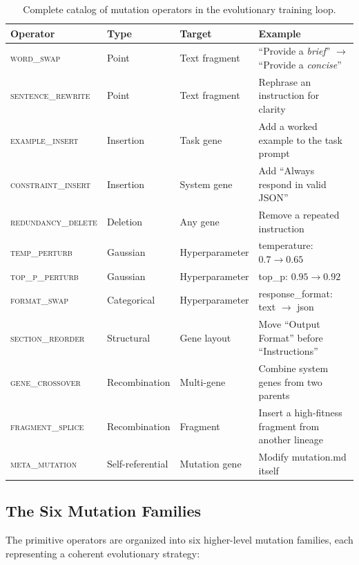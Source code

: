 \begin{table}[H]
\centering
\caption{Complete catalog of mutation operators in the evolutionary training loop.}
\label{tab:mutation-operators}
\renewcommand{\arraystretch}{1.15}
\begin{tabularx}{\textwidth}{l l l Y}
\toprule
\textbf{Operator} & \textbf{Type} & \textbf{Target} & \textbf{Example} \\
\midrule
\textsc{word\_swap} & Point & Text fragment & ``Provide a \emph{brief}'' $\to$ ``Provide a \emph{concise}'' \\
\textsc{sentence\_rewrite} & Point & Text fragment & Rephrase an instruction for clarity \\
\textsc{example\_insert} & Insertion & Task gene & Add a worked example to the task prompt \\
\textsc{constraint\_insert} & Insertion & System gene & Add ``Always respond in valid JSON'' \\
\textsc{redundancy\_delete} & Deletion & Any gene & Remove a repeated instruction \\
\textsc{temp\_perturb} & Gaussian & Hyperparameter & temperature: $0.7 \to 0.65$ \\
\textsc{top\_p\_perturb} & Gaussian & Hyperparameter & top\_p: $0.95 \to 0.92$ \\
\textsc{format\_swap} & Categorical & Hyperparameter & response\_format: text $\to$ json \\
\textsc{section\_reorder} & Structural & Gene layout & Move ``Output Format'' before ``Instructions'' \\
\textsc{gene\_crossover} & Recombination & Multi-gene & Combine system genes from two parents \\
\textsc{fragment\_splice} & Recombination & Fragment & Insert a high-fitness fragment from another lineage \\
\textsc{meta\_mutation} & Self-referential & Mutation gene & Modify mutation.md itself \\
\bottomrule
\end{tabularx}
\end{table}

\subsection{The Six Mutation Families}

The primitive operators are organized into six higher-level mutation families, each representing a coherent evolutionary strategy:

